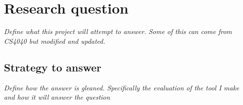 \chapter{Research question\label{chap:research-question}}

\em{Define what this project will attempt to answer. Some of this can come from CS4040 but modified and updated.}

\section{Strategy to answer}
\em{Define how the answer is gleaned. Specifically the evaluation of the tool I make and how it will answer the question}